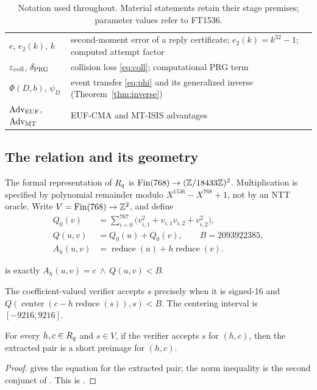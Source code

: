 \begin{table}[!htbp]
\begin{tabular}{@{}>{\raggedright\arraybackslash}p{}>{\raggedright\arraybackslash}p{}@{}}
$e$, $e_2(k)$, $k$ & second-moment error of a reply certificate;
 $e_2(k)=k^{32}-1$; computed attempt factor \\
$\varepsilon_{\mathrm{coll}}$, $\delta_{\mathrm{PRG}}$ & collision loss \eqref{eq:coll}; computational
 PRG term \\
$\Phi(D,b)$, $\psi_D$ & event transfer \eqref{eq:phi} and its
 generalized inverse (Theorem~\ref{thm:inverse}) \\
$\operatorname{Adv}_{\mathrm{EUF}}$, $\operatorname{Adv}_{\mathrm{MT}}$ & EUF-CMA and MT-ISIS
 advantages \\
\bottomrule
\end{tabular}
\caption{Notation used throughout. Material statements retain their
stage premises; parameter values refer to FT1536.}
\label{tab:notation}
\end{table}
\FloatBarrier

\subsection{The relation and its geometry}
The formal representation of $R_q$ is
$\operatorname{Fin}(768)\to(\mathbb{Z}/18433\mathbb{Z})^2$.
Multiplication is specified by polynomial remainder modulo
$X^{1536}-X^{768}+1$, not by an NTT oracle. Write
$V=\operatorname{Fin}(768)\to\mathbb{Z}^2$, and define
\begin{align*}
 Q_0(v)&=\sum_{i=0}^{767}\bigl(v_{i,1}^2+v_{i,1}v_{i,2}+v_{i,2}^2\bigr),\\
 Q(u,v)&=Q_0(u)+Q_0(v),\qquad B=2093922385,\\
 A_h(u,v)&=\operatorname{reduce}(u)+h\operatorname{reduce}(v).
\end{align*}
\begin{definition}\label{def:short}
 is exactly $A_h(u,v)=c\ \wedge\ Q(u,v)<B$.
\end{definition}
The coefficient-valued verifier accepts $s$ precisely when it is signed-16
and
$Q(\operatorname{center}(c-h\operatorname{reduce}(s)),s)<B$.
The centering interval is $[-9216,9216]$.

\begin{proposition}%
\label{prop:extracts}
For every $h,c\in R_q$ and $s\in V$, if the verifier accepts $s$ for
$(h,c)$, then the extracted pair is a short preimage for $(h,c)$.
\end{proposition}
\begin{proof}
 gives the equation for the extracted pair;
the norm inequality is the second conjunct of .
This is .
\end{proof}

